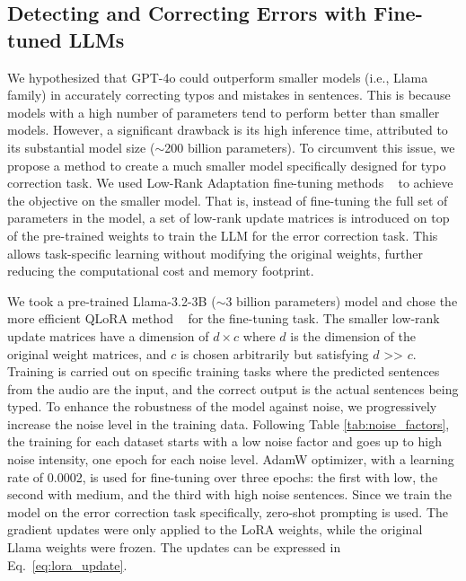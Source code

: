 \subsection{Detecting and Correcting Errors with Fine-tuned LLMs}
We hypothesized that GPT-4o could outperform smaller models (i.e., Llama family) in accurately correcting typos and mistakes in sentences. This is because models with a high number of parameters tend to perform better than smaller models. However, a significant drawback is its high inference time, attributed to its substantial model size ($\sim$200 billion parameters). To circumvent this issue, we propose a method to create a much smaller model specifically designed for typo correction task. We used Low-Rank Adaptation fine-tuning methods ~\cite{dettmers2023qloraefficientfinetuningquantized} to achieve the objective on the smaller model.
That is, instead of fine-tuning the full set of parameters in the model, a set of low-rank update matrices is introduced on top of the pre-trained weights to train the LLM for the error correction task. This allows task-specific learning without modifying the original weights, further reducing the computational cost and memory footprint.
\par
We took a pre-trained Llama-3.2-3B ($\sim$3 billion parameters) model and chose the more efficient QLoRA method ~\cite{unsloth} for the fine-tuning task. The smaller low-rank update matrices have a dimension of $d \times c$ where $d$ is the dimension of the original weight matrices, and $c$ is chosen arbitrarily but satisfying $d$ >{}> $c$.
Training is carried out on specific training tasks where the predicted sentences from the audio are the input, and the correct output is the actual sentences being typed. To enhance the robustness of the model against noise, we progressively increase the noise level in the training data. Following Table \ref{tab:noise_factors}, the training for each dataset starts with a low noise factor and goes up to high noise intensity, one epoch for each noise level. AdamW optimizer, with a learning rate of 0.0002, is used for fine-tuning over three epochs: the first with low, the second with medium, and the third with high noise sentences.
Since we train the model on the error correction task specifically, zero-shot prompting is used. The gradient updates were only applied to the LoRA weights, while the original Llama weights were frozen. The updates can be expressed in Eq.~\ref{eq:lora_update}.
